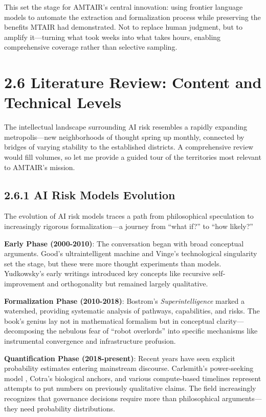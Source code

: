 \documentclass[
  11pt,
  letterpaper,
  openany]{book}
\begin{document}
This set the stage for AMTAIR's central innovation: using frontier
language models to automate the extraction and formalization process
while preserving the benefits MTAIR had demonstrated. Not to replace
human judgment, but to amplify it---turning what took weeks into what
takes hours, enabling comprehensive coverage rather than selective
sampling.

\section{2.6 Literature Review: Content and Technical
Levels}\label{sec-literature-review}

The intellectual landscape surrounding AI risk resembles a rapidly
expanding metropolis---new neighborhoods of thought spring up monthly,
connected by bridges of varying stability to the established districts.
A comprehensive review would fill volumes, so let me provide a guided
tour of the territories most relevant to AMTAIR's mission.

\subsection{2.6.1 AI Risk Models
Evolution}\label{sec-risk-models-evolution}

The evolution of AI risk models traces a path from philosophical
speculation to increasingly rigorous formalization---a journey from
``what if?'' to ``how likely?''

\textbf{Early Phase (2000-2010)}: The conversation began with broad
conceptual arguments. Good's ultraintelligent machine
\textcite{good1966} and Vinge's technological singularity set the stage,
but these were more thought experiments than models. Yudkowsky's early
writings \textcite{yudkowsky2008} introduced key concepts like recursive
self-improvement and orthogonality but remained largely qualitative.

\textbf{Formalization Phase (2010-2018)}: Bostrom's
\emph{Superintelligence} \textcite{bostrom2014} marked a watershed,
providing systematic analysis of pathways, capabilities, and risks. The
book's genius lay not in mathematical formalism but in conceptual
clarity---decomposing the nebulous fear of ``robot overlords'' into
specific mechanisms like instrumental convergence and infrastructure
profusion.

\textbf{Quantification Phase (2018-present)}: Recent years have seen
explicit probability estimates entering mainstream discourse.
Carlsmith's power-seeking model \textcite{carlsmith2022}, Cotra's
biological anchors, and various compute-based timelines represent
attempts to put numbers on previously qualitative claims. The field
increasingly recognizes that governance decisions require more than
philosophical arguments---they need probability distributions.
\end{document}
